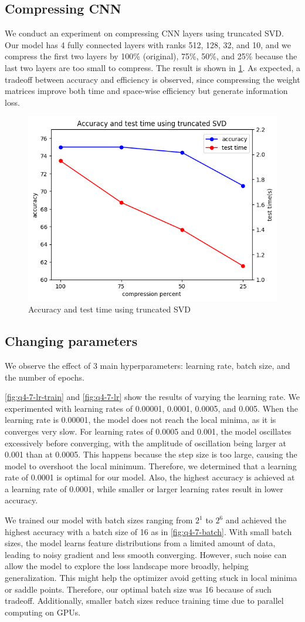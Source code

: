 \subsection{Compressing CNN}
We conduct an experiment on compressing CNN layers using truncated SVD. Our model has 4 fully connected layers with ranks 512, 128, 32, and 10, and we compress the first two layers by 100\% (original), 75\%, 50\%, and 25\% because the last two layers are too small to compress. The result is shown in \cref{fig:cnn_svd}. As expected, a tradeoff between accuracy and efficiency is observed, since compressing the weight matrices improve both time and space-wise efficiency but generate information loss.

\begin{figure}
	\centering
	\includegraphics[width=0.4\linewidth]{image/q4-6-svd.png}
	\caption{Accuracy and test time using truncated SVD}
	\label{fig:cnn_svd}
\end{figure}

\subsection{Changing parameters}
We observe the effect of 3 main hyperparameters: learning rate, batch size, and the number of epochs.

\cref{fig:q4-7-lr-train} and \cref{fig:q4-7-lr} show the results of varying the learning rate. We experimented with learning rates of 0.00001, 0.0001, 0.0005, and 0.005. When the learning rate is 0.00001, the model does not reach the local minima, as it is converges very slow. For learning rates of 0.0005 and 0.001, the model oscillates excessively before converging, with the amplitude of oscillation being larger at 0.001 than at 0.0005. This happens because the step size is too large, causing the model to overshoot the local minimum. Therefore, we determined that a learning rate of 0.0001 is optimal for our model. Also, the highest accuracy is achieved at a learning rate of 0.0001, while smaller or larger learning rates result in lower accuracy. 

We trained our model with batch sizes ranging from $2^1$ to $2^6$ and achieved the highest accuracy with a batch size of 16 as in \cref{fig:q4-7-batch}. With small batch sizes, the model learns feature distributions from a limited amount of data, leading to noisy gradient and less smooth converging. However, such noise can allow the model to explore the loss landscape more broadly, helping generalization. This might help the optimizer avoid getting stuck in local minima or saddle points. Therefore, our optimal batch size was 16 because of such tradeoff. Additionally, smaller batch sizes reduce training time due to parallel computing on GPUs.

